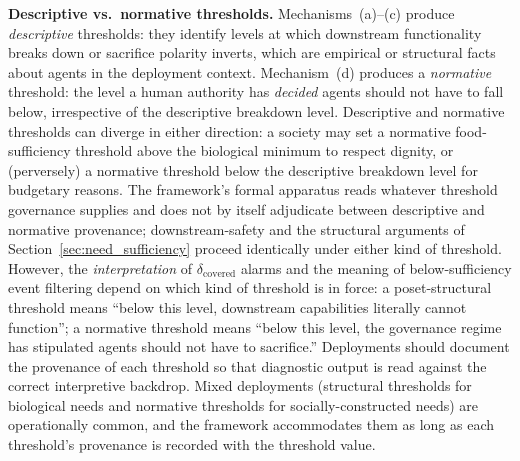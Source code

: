 \medskip\noindent
\textbf{Descriptive vs.\ normative thresholds.}
Mechanisms~(a)--(c) produce \emph{descriptive} thresholds:
they identify levels at which downstream functionality
breaks down or sacrifice polarity inverts, which are
empirical or structural facts about agents in the deployment
context.
Mechanism~(d) produces a \emph{normative} threshold:
the level a human authority has \emph{decided} agents should
not have to fall below, irrespective of the descriptive
breakdown level.  Descriptive and normative thresholds can
diverge in either direction: a society may set a normative
food-sufficiency threshold above the biological minimum to
respect dignity, or (perversely) a normative threshold below
the descriptive breakdown level for budgetary reasons.  The
framework's formal apparatus reads whatever threshold
governance supplies and does not by itself adjudicate between
descriptive and normative provenance; downstream-safety and
the structural arguments of
Section~\ref{sec:need_sufficiency}
proceed identically under either kind of threshold.  However,
the \emph{interpretation} of $\delta_{\mathrm{covered}}$ alarms
and the meaning of below-sufficiency event filtering depend on
which kind of threshold is in force: a poset-structural
threshold means ``below this level, downstream capabilities
literally cannot function''; a normative threshold means
``below this level, the governance regime has stipulated
agents should not have to sacrifice.''  Deployments should
document the provenance of each threshold so that diagnostic
output is read against the correct interpretive backdrop.
Mixed deployments (structural thresholds for biological needs
and normative thresholds for socially-constructed needs) are
operationally common, and the framework accommodates them as
long as each threshold's provenance is recorded with the
threshold value.
